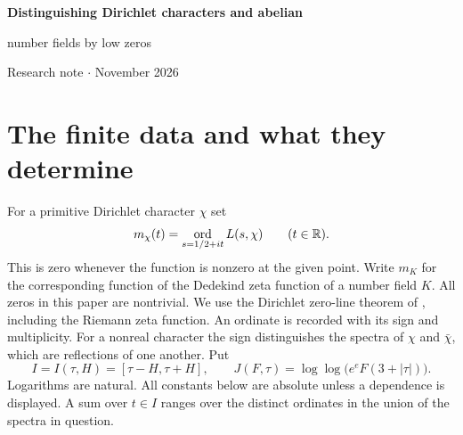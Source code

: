 \documentclass[11pt]{article}
\DeclareMathOperator{\ord}{ord}
\begin{document}
\begin{center}
{\Large\bfseries\color{inkblue} Distinguishing Dirichlet characters and abelian\par
number fields by low zeros\par}
\vspace{.65em}
{\small Research note \enspace$\cdot$ November 2026}
\end{center}
\begin{abstract}
Using Dirichlet GRH, we prove that the strictly positive zero ordinates,
counted with multiplicity, up to height $C\log^2(2Q)/\log\log(3Q)$ determine a primitive Dirichlet
character of conductor at most $Q$, uniformly in its order. The
zero-multiplicity measures of any fixed number of distinct characters have full
linear rank in this range. For abelian number fields of absolute discriminant at
most $D$, a height of $C\log^2(2D)$ determines the field, uniformly in the degree.
Both statements extend to translated intervals and give lower bounds on the
total discrepancy of the multiplicities. The two estimates use different
features of the same explicit formula. A sieve bounds contamination from nearby
prime powers on average over prime centres. An $\ell^2$ estimate controls that
contamination for a sum of characters with bounded total log conductor.
\end{abstract}

\section{The finite data and what they determine}
For a primitive Dirichlet character $\chi$ set
\[
 m_\chi(t)=\ord_{s=1/2+it}L(s,\chi)\qquad(t\in\R).
\]
This is zero whenever the function is nonzero at the given point. Write $m_K$ for the corresponding function of
the Dedekind zeta function of a number field $K$. All zeros in this paper are
nontrivial. We use the Dirichlet zero-line theorem of \cite{lean}, including
the Riemann zeta function. An ordinate is recorded with its sign and
multiplicity. For a nonreal character the sign distinguishes the spectra of
$\chi$ and $\bar\chi$, which are reflections of one another. Put
\[
 I=I(\tau,H)=[\tau-H,\tau+H],\qquad
 J(F,\tau)=\log\log\bigl(e^e F(3+|\tau|)\bigr).
\]
Logarithms are natural. All constants below are absolute unless a dependence
is displayed. A sum over $t\in I$ ranges over the distinct ordinates in the
union of the spectra in question.
\end{document}
